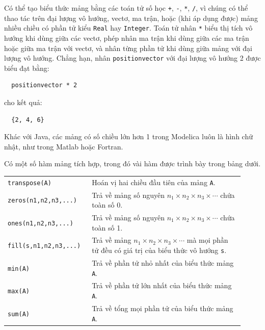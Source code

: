 Có thể tạo biểu thức mảng bằng các toán tử số học \texttt{+}, \texttt{-}, \texttt{*}, \texttt{/}, vì chúng có thể thao tác trên đại lượng vô hướng, vectơ, ma trận, hoặc (khi áp dụng được) mảng nhiều chiều có phần tử kiểu \texttt{Real} hay \texttt{Integer}. Toán tử nhân \texttt{*} biểu thị tích vô hướng khi dùng giữa các vectơ, phép nhân ma trận khi dùng giữa các ma trận hoặc giữa ma trận với vectơ, và nhân từng phần tử khi dùng giữa mảng với đại lượng vô hướng. Chẳng hạn, nhân \texttt{positionvector} với đại lượng vô hướng 2 được biểu đạt bằng:
\begin{verbatim}
  positionvector * 2
\end{verbatim}
cho kết quả:

\begin{verbatim}
  {2, 4, 6}
\end{verbatim}
Khác với Java, các mảng có số chiều lớn hơn 1 trong Modelica luôn là hình chữ nhật, như trong Matlab hoặc Fortran.

Có một số hàm mảng tích hợp, trong đó vài hàm được trình bày trong bảng dưới.
\begin{center}
\begin{tabular}{p{0.31\linewidth}p{0.61\linewidth}}
\hline
\texttt{transpose(A)} & Hoán vị hai chiều đầu tiên của mảng \texttt{A}.\\
\texttt{zeros(n1,n2,n3,...)} & Trả về mảng số nguyên $n_1\times n_2\times n_3\times\cdots$ chứa toàn số 0.\\
\texttt{ones(n1,n2,n3,...)} & Trả về mảng số nguyên $n_1\times n_2\times n_3\times\cdots$ chứa toàn số 1.\\
\texttt{fill(s,n1,n2,n3,...)} & Trả về mảng $n_1\times n_2\times n_3\times\cdots$ mà mọi phần tử đều có giá trị của biểu thức vô hướng \texttt{s}.\\
\texttt{min(A)} & Trả về phần tử nhỏ nhất của biểu thức mảng \texttt{A}.\\
\texttt{max(A)} & Trả về phần tử lớn nhất của biểu thức mảng \texttt{A}.\\
\texttt{sum(A)} & Trả về tổng mọi phần tử của biểu thức mảng \texttt{A}.\\
\hline
\end{tabular}
\end{center}

